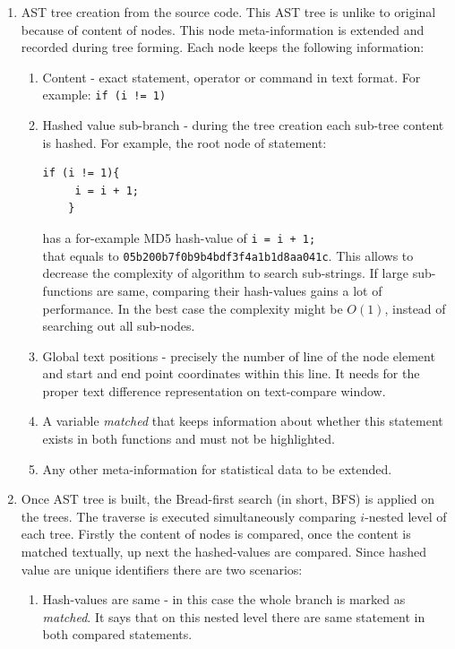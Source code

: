 \documentclass{report}
\begin{document}
\begin{enumerate}
  \item AST tree creation from the source code. This AST tree is unlike to original because of content of nodes. This node meta-information is extended and recorded during tree forming. Each node keeps the following information:
  	\begin{enumerate}[label*=\arabic*.]
		\item Content - exact statement, operator or command in text format. For example: \texttt{if (i != 1)}  	 
		\item Hashed value sub-branch - during the tree creation each sub-tree content is hashed. For example, the root node of statement:
\begin{lstlisting}[frame = none]
	if (i != 1){
	 i = i + 1;
 	}
\end{lstlisting}
		 has a for-example MD5 hash-value of \texttt{i = i + 1;}\\ that equals to \texttt{05b200b7f0b9b4bdf3f4a1b1d8aa041c}. This allows to decrease the complexity of algorithm to search sub-strings. If large sub-functions are same, comparing their hash-values gains a lot of performance. In the best case the complexity might be $O(1)$, instead of searching out all sub-nodes.
		 \item Global text positions - precisely the number of line of the node element and start and end point coordinates within this line. It needs for the proper text difference representation on text-compare window.
		 \item A variable \emph{matched} that keeps information about whether this statement exists in both functions and must not be highlighted.
		 \item Any other meta-information for statistical data to be extended.
  	 \end{enumerate}
  \item Once AST tree is built, the Bread-first search (in short, BFS) is applied on the trees. The traverse is executed simultaneously comparing $i$-nested level of each tree. Firstly the content of nodes is compared, once the content is matched textually, up next the hashed-values are compared. Since hashed value are unique identifiers there are two scenarios:
	  \begin{enumerate}[label*=\arabic*.]
  			\item Hash-values are same - in this case the whole branch is marked as \emph{matched}. It says that on this nested level there are same statement in both compared statements.

\end{enumerate}
\end{enumerate}
\end{document}
